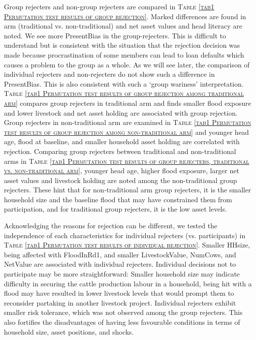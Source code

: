	Group rejecters and non-group rejecters are compared in \textsc{\normalsize Table \ref{tab1 Permutation test results of group rejection}}. Marked differences are found in arm (\textsf{traditional} vs. non-\textsf{traditional}) and net asset values and head literacy are noted. We see more \textsf{PresentBias} in the group-rejecters. This is difficult to understand but is consistent with the situation that the rejection decision was made because procrastination of some members can lead to loan defaults which causes a problem to the group as a whole. As we will see later, the comparison of individual rejecters and non-rejecters do not show such a difference in \textsf{PresentBias}. This is also consistent with such a `group wariness' interpretation. \textsc{\normalsize Table \ref{tab1 Permutation test results of group rejection among traditional arm}} compares group rejecters in \textsf{traditional} arm and finds smaller flood exposure and lower livestock and net asset holding are associated with group rejection. Group rejecters in non-\textsf{traditional} arm are examined in \textsc{\normalsize Table \ref{tab1 Permutation test results of group rejection among non-traditional arm}} and younger head age, flood at baseline, and smaller household asset holding are correlated with rejection. Comparing group rejecters between \textsf{traditional} and non-\textsf{traditional} arms in \textsc{\normalsize Table \ref{tab1 Permutation test results of group rejecters, traditional vs. non-traditional arm}}, younger head age, higher flood exposure, larger net asset values and livestock holding are noted among the non-\textsf{traditional} group rejecters. These hint that for non-\textsf{traditional} arm group rejecters, it is the smaller household size and the baseline flood that may have constrained them from participation, and for \textsf{traditional} group rejecters, it is the low asset levels.

	Acknowledging the reasons for rejection can be different, we tested the independence of each characteristics for individual rejecters (vs. participants) in \textsc{\normalsize Table \ref{tab1 Permutation test results of individual rejection}}. Smaller \textsf{HHsize}, being affected with \textsf{FloodInRd1}, and smaller \textsf{LivestockValue}, \textsf{NumCows}, and \textsf{NetValue} are associated with individual rejecters. Individual decisions not to participate may be more straightforward: Smaller household size may indicate difficulty in securing the cattle production labour in a household, being hit with a flood may have resulted in lower livestock levels that would prompt them to reconsider partaking in another livestock project. Individual rejecters exhibit smaller risk tolerance, which was not observed among the group rejecters. This also fortifies the disadvantages of having less favourable conditions in terms of household size, asset positions, and shocks.

